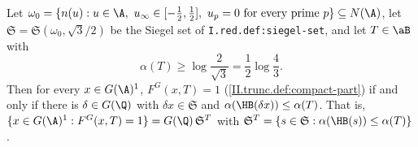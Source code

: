 Let $\omega_0=\{n(u):u\in\A,\ u_\infty\in[-\tfrac12,\tfrac12],\ u_p=0\text{ for every prime }p\}\subseteq N(\A)$, let
$\mathfrak S=\mathfrak S(\omega_0,\sqrt3/2)$ be the Siegel set of \texttt{I.red.def:siegel-set}, and let $T\in\aB$ with
\[
  \alpha(T)\ge\log\frac2{\sqrt3}=\frac12\log\frac43 .
\]
Then for every $x\in G(\A)^1$, $F^G(x,T)=1$ (\cref{II.trunc.def:compact-part}) if and only if there is $\delta\in G(\Q)$ with
$\delta x\in\mathfrak S$ and $\alpha(\HB(\delta x))\le\alpha(T)$. That is, $\{x\in G(\A)^1:F^G(x,T)=1\}=G(\Q)\,\mathfrak S^T$ with
$\mathfrak S^T=\{s\in\mathfrak S:\alpha(\HB(s))\le\alpha(T)\}$.
